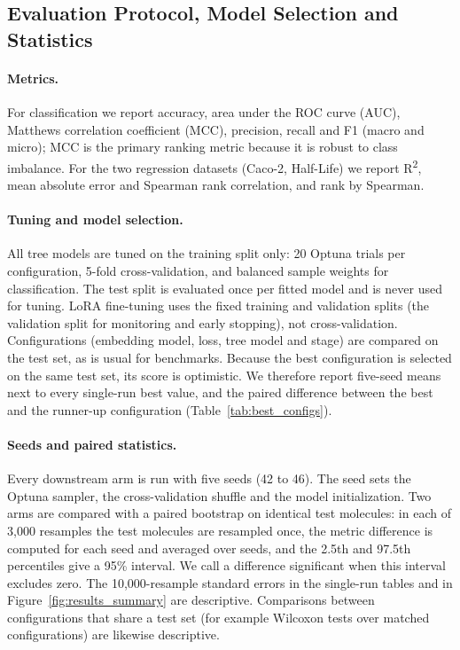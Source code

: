 \documentclass[pdflatex,sn-mathphys-num]{sn-jnl}%
\begin{document}
\subsection{Evaluation Protocol, Model Selection and Statistics}\label{sec:eval_protocol}
\paragraph{Metrics.} For classification we report accuracy, area under the ROC curve (AUC), Matthews correlation coefficient (MCC), precision, recall and F1 (macro and micro); MCC is the primary ranking metric because it is robust to class imbalance. For the two regression datasets (Caco-2, Half-Life) we report R\textsuperscript{2}, mean absolute error and Spearman rank correlation, and rank by Spearman.

\paragraph{Tuning and model selection.} All tree models are tuned on the training split only: 20 Optuna trials per configuration, 5-fold cross-validation, and balanced sample weights for classification. The test split is evaluated once per fitted model and is never used for tuning. LoRA fine-tuning uses the fixed training and validation splits (the validation split for monitoring and early stopping), not cross-validation. Configurations (embedding model, loss, tree model and stage) are compared on the test set, as is usual for benchmarks. Because the best configuration is selected on the same test set, its score is optimistic. We therefore report five-seed means next to every single-run best value, and the paired difference between the best and the runner-up configuration (Table~\ref{tab:best_configs}).

\paragraph{Seeds and paired statistics.} Every downstream arm is run with five seeds (42 to 46). The seed sets the Optuna sampler, the cross-validation shuffle and the model initialization. Two arms are compared with a paired bootstrap on identical test molecules: in each of 3{,}000 resamples the test molecules are resampled once, the metric difference is computed for each seed and averaged over seeds, and the 2.5th and 97.5th percentiles give a 95\% interval. We call a difference significant when this interval excludes zero. The 10{,}000-resample standard errors in the single-run tables and in Figure~\ref{fig:results_summary} are descriptive. Comparisons between configurations that share a test set (for example Wilcoxon tests over matched configurations) are likewise descriptive.
\end{document}
